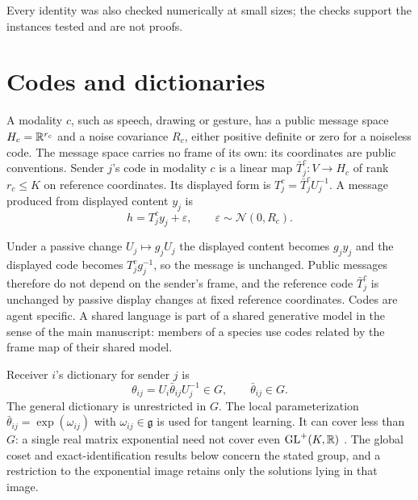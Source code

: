 \documentclass[11pt,letterpaper]{report}
\begin{document}
Every identity was also checked numerically at small sizes; the checks support the instances tested and are not proofs.

\begingroup
\small
\tableofcontents
\endgroup
\clearpage
{}

\chapter{Codes and dictionaries}
\label{it1:ch-objects}

A modality $c$, such as speech, drawing or gesture, has a public message space $H_c=\mathbb R^{r_c}$ and a noise covariance $R_c$, either positive definite or zero for a noiseless code. The message space carries no frame of its own: its coordinates are public conventions. Sender $j$'s code in modality $c$ is a linear map $\bar T_j^c:V\to H_c$ of rank $r_c\leq K$ on reference coordinates. Its displayed form is $T_j^c=\bar T_j^cU_j^{-1}$. A message produced from displayed content $y_j$ is
\begin{equation}
h=T_j^cy_j+\varepsilon,\qquad\varepsilon\sim\mathcal N(0,R_c).
\label{it1:message}
\end{equation}

Under a passive change $U_j\mapsto g_jU_j$ the displayed content becomes $g_jy_j$ and the displayed code becomes $T_j^cg_j^{-1}$, so the message is unchanged. Public messages therefore do not depend on the sender's frame, and the reference code $\bar T_j^c$ is unchanged by passive display changes at fixed reference coordinates. Codes are agent specific. A shared language is part of a shared generative model in the sense of the main manuscript: members of a species use codes related by the frame map of their shared model.

Receiver $i$'s dictionary for sender $j$ is
\begin{equation}
\theta_{ij}=U_i\bar\theta_{ij}U_j^{-1}\in G,\qquad
\bar\theta_{ij}\in G.
\label{it1:dictionary-eq}
\end{equation}
The general dictionary is unrestricted in $G$. The local parameterization $\bar\theta_{ij}=\exp(\omega_{ij})$ with $\omega_{ij}\in\mathfrak g$ is used for tangent learning. It can cover less than $G$: a single real matrix exponential need not cover even $\mathrm{GL}^+(K,\mathbb R)$ \citep{Culver1966}. The global coset and exact-identification results below concern the stated group, and a restriction to the exponential image retains only the solutions lying in that image.
\end{document}
